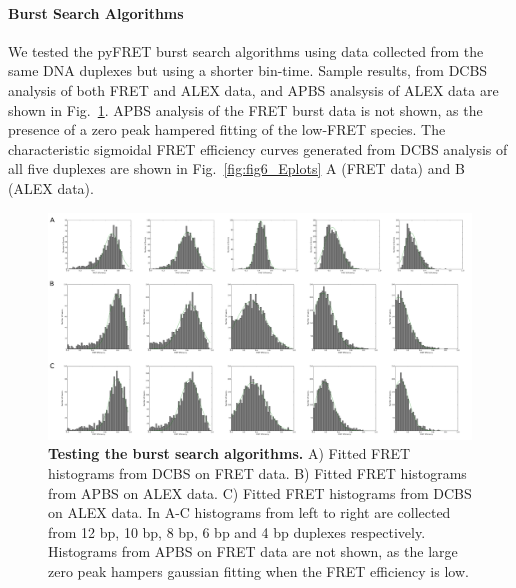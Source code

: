 \paragraph{Burst Search Algorithms}
We tested the pyFRET burst search algorithms using data collected from the same DNA duplexes but using a shorter bin-time. Sample results, from DCBS analysis of both FRET and ALEX data, and APBS analsysis of ALEX data are shown in Fig.~\ref{fig:burst_search}. APBS analysis of the FRET burst data is not shown, as the presence of a zero peak hampered fitting of the low-FRET species. The characteristic sigmoidal FRET efficiency curves generated from DCBS analysis of all five duplexes are shown in Fig.~\ref{fig:fig6_Eplots} A (FRET data) and B (ALEX data).

\begin{figure}[!ht]
   \begin{center}
      \includegraphics*[clip=true, width=6in]{pyFRET/burst_search.pdf}
      \caption{{\bf Testing the burst search algorithms.} A) Fitted FRET histograms from DCBS on FRET data. B) Fitted FRET histograms from APBS on ALEX data. C) Fitted FRET histograms from DCBS on ALEX data. In A-C histograms from left to right are collected from 12 bp, 10 bp, 8 bp, 6 bp and 4 bp duplexes respectively. Histograms from APBS on FRET data are not shown, as the large zero peak hampers gaussian fitting when the FRET efficiency is low.}
      \label{fig:burst_search}
   \end{center}
\end{figure}



